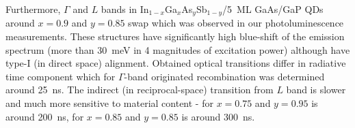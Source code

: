 Furthermore, $\Gamma$ and $L$ bands in In$_{1-x}$Ga$_x$As$_y$Sb$_{1-y}$/5~ML GaAs/GaP QDs around $x=0.9$ and $y=0.85$ swap which was observed in our photoluminescence measurements. These structures have significantly high blue-shift of the emission spectrum (more than 30~meV in 4 magnitudes of excitation power) although have type-I (in direct space) alignment. Obtained optical transitions differ in radiative time component which for $\Gamma$-band originated recombination was determined around 25~ns. The indirect (in reciprocal-space) transition from $L$ band is slower and much more sensitive to material content - for $x=0.75$ and $y=0.95$ is around 200~ns, for $x=0.85$ and $y=0.85$ is around 300~ns.


\newpage

\newpage 